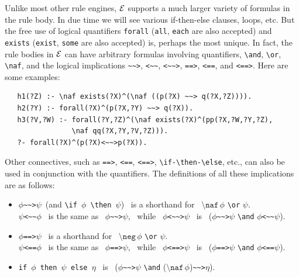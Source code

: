 \documentclass[11pt]{article}
\newcommand{\ERGO}{\mbox{\ensuremath{\cal{E}}\smaller{{\sc{RGO}}}}\xspace}
\newcommand{\FLSYSTEM}{\ERGO}
\newcommand{\rnafarr}{\texttt{\textasciitilde\textasciitilde>}}
\newcommand{\lnafarr}{\texttt{<\textasciitilde\textasciitilde}}
\newcommand{\rlnafarr}{\texttt{<\textasciitilde\textasciitilde>}}
\newcommand{\bs}{\textbackslash}
\newcommand{\RULELOGNAF}{{\texttt{{\bs}naf}}\xspace}
\newcommand{\RULELOGNEG}{{\texttt{{\bs}neg}}\xspace}
\begin{document}
\index{\rnafarr}
\index{\lnafarr}
\index{\rlnafarr}
\index{\url{==>}}
\index{\url{<==}}
\index{\url{<==>}}
Unlike most other rule engines, \FLSYSTEM supports a much larger variety of
formulas in the rule body. In due time we will see various if-then-else
clauses, loops, etc. But the free use of logical quantifiers
\texttt{forall} (\texttt{all}, \texttt{each} are also accepted) and
\texttt{exists} (\texttt{exist}, \texttt{some} are also accepted) is, perhaps the most unique. In fact, the rule bodies in 
\FLSYSTEM can have
arbitrary formulas involving quantifiers, \texttt{\bs{}and},
\texttt{\bs{}or}, \texttt{\RULELOGNAF}, and the logical implications \rnafarr,
\lnafarr, \rlnafarr, \texttt{==>}, \texttt{<==}, and \texttt{<==>}.
Here are some examples:
\begin{verbatim}
   h1(?Z) :- \naf exists(?X)^(\naf ((p(?X) ~~> q(?X,?Z)))).
   h2(?Y) :- forall(?X)^(p(?X,?Y) ~~> q(?X)). 
   h3(?V,?W) :- forall(?Y,?Z)^(\naf exists(?X)^(pp(?X,?W,?Y,?Z),
                \naf qq(?X,?Y,?V,?Z))).
   ?- forall(?X)^(p(?X)<~~>p(?X)).
\end{verbatim}
Other connectives, such as \texttt{==>}, \texttt{<==}, \texttt{<==>},
\texttt{\bs{}if-\bs{}then-\bs{}else}, etc., 
can also be used in conjunction with the quantifiers.
The definitions of all these implications are as follows:
\begin{itemize}
\item  $\phi$\rnafarr$\psi$\, (and
  \texttt{\bs{}if\,$\phi$\,\bs{}then\,$\psi$})~
  is a shorthand for~ $\RULELOGNAF\,\phi$
  \texttt{\bs{}or} $\psi$.\\
  $\psi$\lnafarr$\phi$~ is the same as~ $\phi$\rnafarr$\psi$,~ while~
  $\phi$\rlnafarr$\psi$~ is~ ($\phi$\rnafarr$\psi$ \texttt{\bs{}and} 
  $\phi$\lnafarr$\psi$).
\item  $\phi$\texttt{==>}$\psi$~ is a shorthand for~ $\RULELOGNEG\,\phi$
  \texttt{\bs{}or} $\psi$.\\
  $\psi$\texttt{<==}$\phi$~ is the same as~ $\phi$\texttt{==>}$\psi$,~ while~
  $\phi$\texttt{<==>}$\psi$~ is~ ($\phi$\texttt{==>}$\psi$ \texttt{\bs{}and}
  $\phi$\texttt{<==}$\psi$).
\item \texttt{if\,$\phi$\,then\,$\psi$\,else\,$\eta$}~ is~
  ($\phi$\rnafarr$\psi$ \texttt{\bs{}and}
  ($\RULELOGNAF\,\phi$)\rnafarr$\eta$).
\end{itemize}
\end{document}
